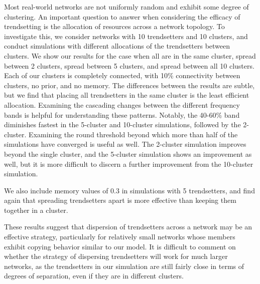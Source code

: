 \documentclass[11pt]{article}
\begin{document}
Most real-world networks are not uniformly random and exhibit some
degree of clustering. An important question to answer when considering
the efficacy of trendsetting is the allocation of resources across a
network topology. To investigate this, we consider networks with 10
trendsetters and 10 clusters, and conduct simulations with different
allocations of the trendsetters between clusters. We show our results
for the case when all are in the same cluster, spread between 2
clusters, spread between 5 clusters, and spread between all 10 clusters.
Each of our clusters is completely connected, with 10\% connectivity
between clusters, no prior, and no memory. The differences between the
results are subtle, but we find that placing all trendsetters in the
same cluster is the least efficient allocation. Examining the cascading
changes between the different frequency bands is helpful for
understanding these patterns. Notably, the 40-60\% band diminishes
fastest in the 5-cluster and 10-cluster simulations, followed by the
2-cluster. Examining the round threshold beyond which more than half of
the simulations have converged is useful as well. The 2-cluster
simulation improves beyond the single cluster, and the 5-cluster
simulation shows an improvement as well, but it is more difficult to
discern a further improvement from the 10-cluster simulation.

We also include memory values of 0.3 in simulations with 5 trendsetters,
and find again that spreading trendsetters apart is more effective than
keeping them together in a cluster.

These results suggest that dispersion of trendsetters across a network
may be an effective strategy, particularly for relatively small networks
whose members exhibit copying behavior similar to our model. It is
difficult to comment on whether the strategy of dispersing trendsetters
will work for much larger networks, as the trendsetters in our
simulation are still fairly close in terms of degrees of separation,
even if they are in different clusters.
\end{document}
